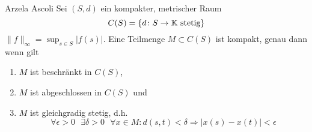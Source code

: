 	\begin{karte}{Arzela Ascoli}
	Sei $(S, d)$ ein kompakter, metrischer Raum
	\[ C(S) = \{ d \colon S \rightarrow \mathbb{K} \text{ stetig} \} \]
	$\| f \|_{\infty} = \sup_{s \in S} | f(s) |$. Eine Teilmenge $M \subset C(S)$ ist kompakt, genau dann wenn gilt
		\begin{enumerate}[label=\alph*\upshape)]
			\item $M$ ist beschränkt in $C(S)$,
			\item $M$ ist abgeschlossen in $C(S)$ und
			\item $M$ ist gleichgradig stetig, d.h.
				\[ \forall \epsilon > 0 \text{ } \exists \delta > 0 \text{ } \forall x \in M: d(s, t) < \delta \Rightarrow | x(s) - x(t) | < \epsilon \]
		\end{enumerate}
	\end{karte}
	